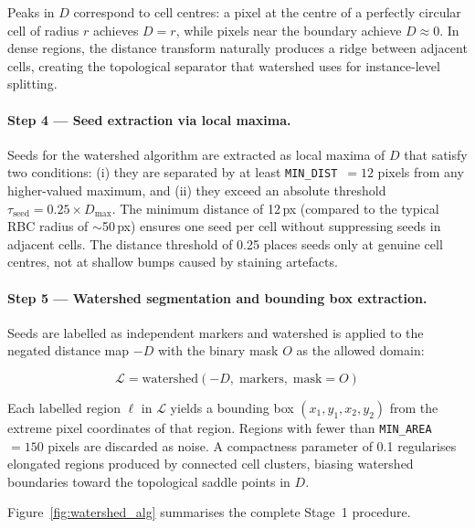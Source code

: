 \documentclass[review,12pt]{elsarticle}
\begin{document}
Peaks in $D$ correspond to cell centres: a pixel at the centre of a
perfectly circular cell of radius $r$ achieves $D = r$, while pixels
near the boundary achieve $D \approx 0$. In dense regions, the distance
transform naturally produces a ridge between adjacent cells, creating
the topological separator that watershed uses for instance-level splitting.

\paragraph{Step 4 --- Seed extraction via local maxima.}
Seeds for the watershed algorithm are extracted as local maxima of $D$
that satisfy two conditions: (i) they are separated by at least
\texttt{MIN\_DIST}~$= 12$ pixels from any higher-valued maximum, and
(ii) they exceed an absolute threshold $\tau_{\text{seed}} = 0.25 \times D_{\max}$.
The minimum distance of 12\,px (compared to the typical RBC radius of
$\sim$50\,px) ensures one seed per cell without suppressing seeds in
adjacent cells. The distance threshold of 0.25 places seeds only at
genuine cell centres, not at shallow bumps caused by staining artefacts.

\paragraph{Step 5 --- Watershed segmentation and bounding box extraction.}
Seeds are labelled as independent markers and watershed is applied to the
negated distance map $-D$ with the binary mask $O$ as the allowed domain:

\begin{equation}
  \mathcal{L} = \text{watershed}(-D,\; \text{markers},\; \text{mask}=O)
  \label{eq:watershed}
\end{equation}

Each labelled region $\ell$ in $\mathcal{L}$ yields a bounding box
$(x_1, y_1, x_2, y_2)$ from the extreme pixel coordinates of that region.
Regions with fewer than \texttt{MIN\_AREA}~$= 150$ pixels are discarded
as noise. A compactness parameter of 0.1 regularises elongated regions
produced by connected cell clusters, biasing watershed boundaries toward
the topological saddle points in $D$.

Figure~\ref{fig:watershed_alg} summarises the complete Stage~1 procedure.
\end{document}
